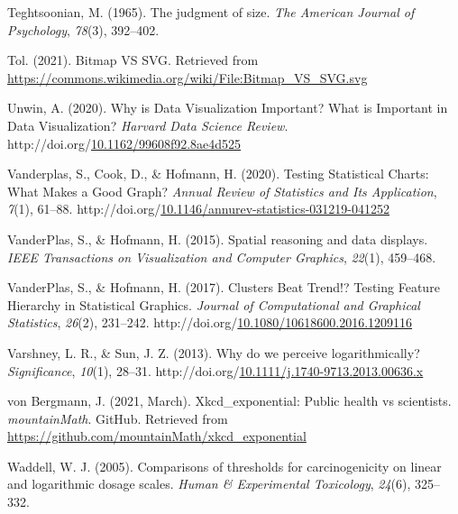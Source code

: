 \documentclass[print]{nuthesis}
\newlength{\cslhangindent}
\newenvironment{CSLReferences}%
{\setlength{\parindent}{0pt}%
\everypar{\setlength{\hangindent}{\cslhangindent}}\ignorespaces}%
{\par}
\begin{document}
\begin{CSLReferences}{1}{0}
\leavevmode{}%
Teghtsoonian, M. (1965). The judgment of size. \emph{The American Journal of Psychology}, \emph{78}(3), 392--402.

\leavevmode{}%
Tol. (2021). Bitmap VS SVG. Retrieved from \url{https://commons.wikimedia.org/wiki/File:Bitmap_VS_SVG.svg}

\leavevmode{}%
Unwin, A. (2020). Why is {Data} {Visualization} {Important}? {What} is {Important} in {Data} {Visualization}? \emph{Harvard Data Science Review}. http://doi.org/\href{https://doi.org/10.1162/99608f92.8ae4d525}{10.1162/99608f92.8ae4d525}

\leavevmode{}%
Vanderplas, S., Cook, D., \& Hofmann, H. (2020). Testing {Statistical} {Charts}: {What} {Makes} a {Good} {Graph}? \emph{Annual Review of Statistics and Its Application}, \emph{7}(1), 61--88. http://doi.org/\href{https://doi.org/10.1146/annurev-statistics-031219-041252}{10.1146/annurev-statistics-031219-041252}

\leavevmode{}%
VanderPlas, S., \& Hofmann, H. (2015). Spatial reasoning and data displays. \emph{IEEE Transactions on Visualization and Computer Graphics}, \emph{22}(1), 459--468.

\leavevmode{}%
VanderPlas, S., \& Hofmann, H. (2017). Clusters {Beat} {Trend}!? {Testing} {Feature} {Hierarchy} in {Statistical} {Graphics}. \emph{Journal of Computational and Graphical Statistics}, \emph{26}(2), 231--242. http://doi.org/\href{https://doi.org/10.1080/10618600.2016.1209116}{10.1080/10618600.2016.1209116}

\leavevmode{}%
Varshney, L. R., \& Sun, J. Z. (2013). Why do we perceive logarithmically? \emph{Significance}, \emph{10}(1), 28--31. http://doi.org/\href{https://doi.org/10.1111/j.1740-9713.2013.00636.x}{10.1111/j.1740-9713.2013.00636.x}

\leavevmode{}%
von Bergmann, J. (2021, March). Xkcd\_exponential: Public health vs scientists. \emph{mountainMath}. GitHub. Retrieved from \url{https://github.com/mountainMath/xkcd_exponential}

\leavevmode{}%
Waddell, W. J. (2005). Comparisons of thresholds for carcinogenicity on linear and logarithmic dosage scales. \emph{Human \& Experimental Toxicology}, \emph{24}(6), 325--332.


\end{CSLReferences}
\end{document}
